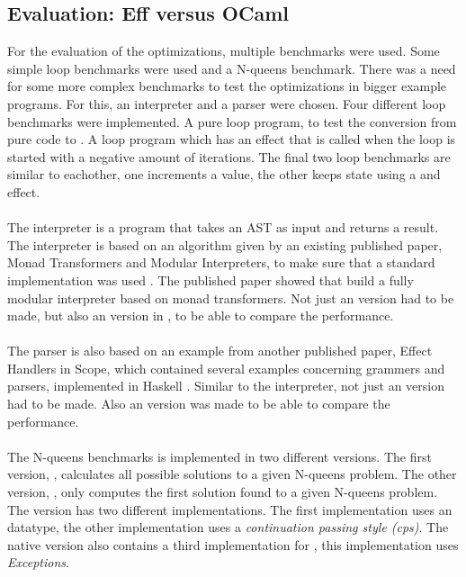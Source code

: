 \subsection{Evaluation: Eff versus OCaml}
For the evaluation of the optimizations, multiple benchmarks were used. Some simple loop benchmarks were used and a N-queens benchmark. There was a need for some more complex benchmarks to test the optimizations in bigger example programs. For this, an interpreter and a parser were chosen. Four different loop benchmarks were implemented. A pure loop program, to test the conversion from pure \eff code to \ocaml.  A loop program which has an effect  that is called when the loop is started with a negative amount of iterations. The final two loop benchmarks are similar to eachother, one increments a value, the other keeps state using a  and  effect.\\
\\
The interpreter is a program that takes an AST as input and returns a result. The interpreter is based on an algorithm given by an existing published paper, Monad Transformers and Modular Interpreters,  to make sure that a standard implementation was used \cite{interpreter}. The published paper showed that build a fully modular interpreter based on monad transformers. Not just an \eff version had to be made, but also an version in \ocaml, to be able to compare the performance. \\
\\
The parser is also based on an example from another published paper, Effect Handlers in Scope, which contained several examples concerning grammers and parsers, implemented in Haskell \cite{scope}. Similar to the interpreter, not just an \eff version had to be made. Also an \ocaml version was made to be able to compare the performance. \\
\\
The N-queens benchmarks is implemented in two different versions. The first version, , calculates all possible solutions to a given N-queens problem. The other version, ,  only computes the first solution found to a given N-queens problem. The  version has two different implementations. The first implementation uses an  datatype, the other implementation uses a \textit{continuation passing style (cps)}. The native version also contains a third implementation for , this implementation uses \textit{Exceptions}. 

